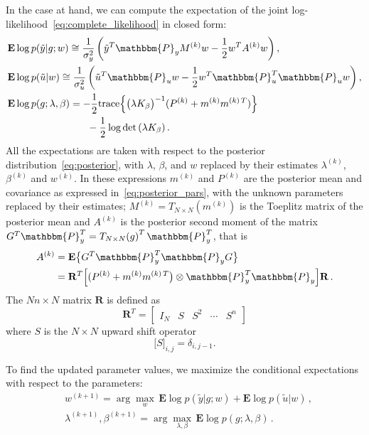 \documentclass[10pt]{article}
\newcommand{\devec}{\mathbf{R}}
\renewcommand{\P}{\mathbbm{P}}
\newcommand{\E}{\mathbf{E}}
\newcommand{\trace}{\mathrm{trace}}
\newcommand{\rmatrix}[1]{\begin{bmatrix}#1\end{bmatrix}}
\begin{document}
In the case at hand, we can compute the expectation of the joint log-likelihood~\eqref{eq:complete_likelihood} in closed form:
\begin{equation*}
  \begin{split}
    & \E\log p(\tilde y|g;w) \cong \frac{1}{\sigma_y^2}\left(\tilde y^T \P_y
    M^{(k)}w - \frac{1}{2}w^T A^{(k)} w\right),\\ & \E\log p(\tilde u|w) \cong
    \frac{1}{\sigma_u^2}\left(\tilde u^T\P_u w  - \frac{1}{2}w^T\P_u^T\P_u
    w\right),\\ & \E\log p(g;\lambda,\beta) =
      -\frac{1}{2}\trace\Big\{{\big(\lambda
    K_\beta\big)}^{-1}(P^{(k)}+m^{(k)}m^{(k)\,T})\Big\} \\ &\hspace{8em}-
\frac{1}{2}\log\det\left( \lambda K_\beta \right).
\end{split}
\end{equation*}
All the expectations are taken with respect to the posterior
distribution~\eqref{eq:posterior}, with $\lambda$, $\beta$, and $w$ replaced by
their estimates $\lambda^{(k)}$, $\beta^{(k)}$ and $w^{(k)}$. In these
expressions $m^{(k)}$ and  $P^{(k)}$ are the posterior mean and covariance as
expressed in~\eqref{eq:posterior_pars}, with the unknown parameters replaced by
their estimates; $M^{(k)}=T_{N\times N}(m^{(k)})$ is the Toeplitz matrix of the
posterior mean and $A^{(k)}$ is the posterior second moment of the matrix
$G^T\P_y^T=T_{N\times N}{(g)}^T \,\P_y^T$, that is
\begin{equation}
  \begin{split}
    A^{(k)} &= \E\big\{G^T\P_y^T\P_y G \big\}\\ &=
  \devec^T\Big[(P^{(k)} + m^{(k)}m^{(k)\,T}\big) \otimes \P_y^T\P_y\Big] \devec
\,.  \end{split}
\end{equation}
The $Nn\times N$ matrix $\devec$ is defined as
\begin{equation}
  \devec^T = \rmatrix{I_N & S & S^2 & \cdots & S^n}
\end{equation}
where $S$ is the $N\times N$ upward shift operator
\begin{equation}
  \label{eq:shift_op} {\big[S\big]}_{i,j} = \delta_{i,j-1}.
\end{equation}

To find the updated parameter values, we maximize the conditional expectations
with respect to the parameters:
\begin{align}
    & w^{(k+1)} = \arg\max_w\, \E\log p(\tilde y|g;w)+ \E\log p(\tilde u
|w)\,,\label{eq:update_w} \\
    &\lambda^{(k+1)}, \beta^{(k+1)} = \arg\max_{\lambda,\beta}\,\E\log
    p(g;\lambda,\beta)\,. \label{eq:update_hypers}
\end{align}
\end{document}
